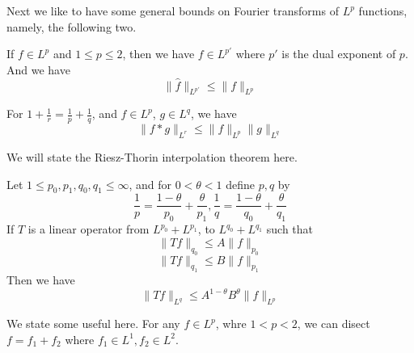 \documentclass[lang=en,10pt, color=none]{elegantbook}
\begin{document}
Next we like to have some general bounds on Fourier transforms of $L^p$ functions, namely, the following two.
\begin{theorem}
    If $f\in L^p$ and $1\leq p\leq 2$, then we have $f\in L^{p'}$ where $p'$ is the dual exponent of $p$. And we have
    \begin{equation*}
        \|\hat{f}\|_{L^{p'}}\leq\|f\|_{L^p}
    \end{equation*}
\end{theorem}
\begin{comment}
    It was proven using the Riesz-Thorin. We have $\|\hat{f}\|_{L^\infty}\leq\|f\|_{L^1}$, and $\|\hat{f}\|_{L^2}=\|f\|_{L^2}$.
\end{comment}
\begin{theorem}
    For $1+\frac{1}{r}=\frac{1}{p}+\frac{1}{q}$, and $f\in L^p$, $g\in L^q$, we have 
    \begin{equation*}
        \|f\ast g\|_{L^r}\leq\|f\|_{L^p}\|g\|_{L^q}
    \end{equation*}
\end{theorem}

We will state the Riesz-Thorin interpolation theorem here.
\begin{theorem}
    Let $1\leq p_0, p_1, q_0, q_1\leq\infty$, and for $0<\theta<1$ define $p,q$ by
    \begin{equation*}
        \frac{1}{p}=\frac{1-\theta}{p_0}+\frac{\theta}{p_1}, \frac{1}{q}=\frac{1-\theta}{q_0}+\frac{\theta}{q_1}
    \end{equation*}
    If $T$ is a linear operator from $L^{p_0}+L^{p_1}$, to $L^{q_0}+L^{q_1}$ such that
    \begin{equation*}
        \|Tf\|_{q_0}\leq A\|f\|_{p_0}
    \end{equation*}
    \begin{equation*}
        \|Tf\|_{q_1}\leq B\|f\|_{p_1}
    \end{equation*}
    Then we have
    \begin{equation*}
        \|Tf\|_{L^q}\leq A^{1-\theta}B^\theta\|f\|_{L^p}
    \end{equation*}
\end{theorem}
\begin{proposition}
    We state some useful here. For any $f\in L^p$, whre $1<p<2$, we can disect $f=f_1+f_2$ where $f_1\in L^1, f_2\in L^2$.
\end{proposition}
\begin{comment}
    We simply choose $f_1=f\chi_{x:|f(x)|>1}$.
\end{comment}
\end{document}
